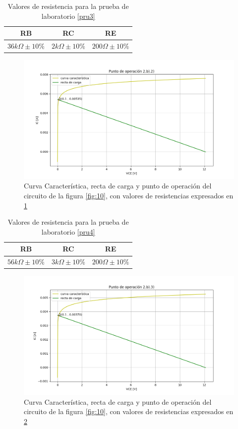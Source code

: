 \documentclass[10pt, a4paper]{article}
\begin{document}
    \newpage

    \begin{table}[h!]
        \centering
        \caption{Valores de resistencia para la prueba de laboratorio \ref{pru3}}
        \label{tab:2b2}
        \begin{tabular}{|c|c|c|} \hline
            RB & RC & RE \\ \hline
            $36k\Omega \pm 10\%$ & $2k\Omega \pm 10\%$ & $200\Omega \pm 10\%$ \\ \hline
        \end{tabular}
    \end{table}

    \begin{figure}[h!]
        \centering
        \includegraphics[height=5cm\textwidth]{2b2.png}
        \caption{Curva Característica, recta de carga y punto de operación del circuito de la figura \ref{fig:10}, con valores de resistencias expresados en \ref{tab:2b2}}
        \label{fig:2b2}
    \end{figure}
    
    \begin{table}[h!]
        \centering
        \caption{Valores de resistencia para la prueba de laboratorio \ref{pru4}}
        \label{tab:2b3}
        \begin{tabular}{|c|c|c|} \hline
            RB & RC & RE \\ \hline
            $56k\Omega \pm 10\%$ & $3k\Omega \pm 10\%$ & $200\Omega \pm 10\%$ \\ \hline
        \end{tabular}
    \end{table}

    \begin{figure}[h!]
        \centering
        \includegraphics[height=5cm\textwidth]{2b3.png}
        \caption{Curva Característica, recta de carga y punto de operación del circuito de la figura \ref{fig:10}, con valores de resistencias expresados en \ref{tab:2b3}}
        \label{fig:2b3}
    \end{figure}
\end{document}
